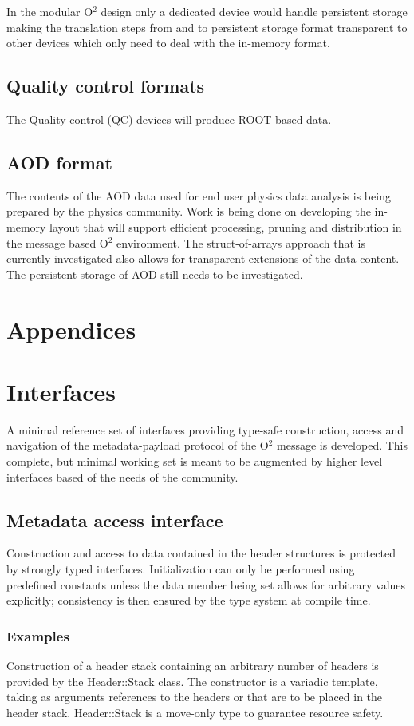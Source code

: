\documentclass[a4paper,twoside]{article}
\def\O2{O$^2$}
\begin{document}
{In the modular \O2 design only a dedicated device would handle persistent storage making the translation steps from and to persistent storage format transparent to other devices which only need to deal with the in-memory format.

\subsection{Quality control formats}
The Quality control (QC) devices will produce ROOT based data.

\subsection{AOD format}
The contents of the AOD data used for end user physics data analysis is being prepared by the physics community. Work is being done on developing the in-memory layout that will support efficient processing, pruning and distribution in the message based \O2 environment. The struct-of-arrays approach that is currently investigated also allows for transparent extensions of the data content. The persistent storage of AOD still needs to be investigated.
}

\clearpage
\section*{Appendices}
\appendix
\section{Interfaces}

A minimal reference set of interfaces providing type-safe construction, access and navigation of the metadata-payload protocol of the \O2 message is developed.
This complete, but minimal working set is meant to be augmented by higher level interfaces based of the needs of the community.


\subsection{Metadata access interface}

Construction and access to data contained in the header structures is protected by strongly typed interfaces.
Initialization can only be performed using predefined constants unless the data member being set allows for arbitrary values explicitly; consistency is then ensured by the type system at compile time.

\subsubsection{Examples}
Construction of a header stack containing an arbitrary number of headers is provided by the Header::Stack class.
The constructor is a variadic template, taking as arguments references to the headers or that are to be placed in the header stack.
Header::Stack is a move-only type to guarantee resource safety.
\end{document}
